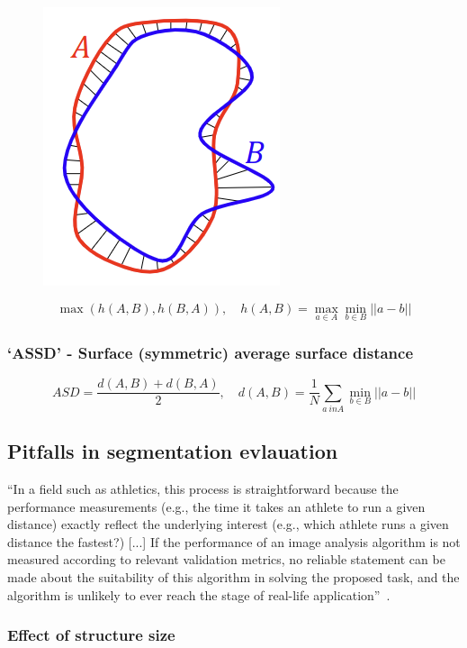 \documentclass[11pt]{article}
\begin{document}
\begin{figure}[H]
    \centering
    \includegraphics[width=.2\linewidth]{figures/Hausdorff.png}
\end{figure}

\begin{definition}
    \begin{equation*}
        \max(h(A,B),h(B,A)), \quad h(A,B) = \max_{a\in A} \min_{b\in B} ||a-b||
    \end{equation*}
\end{definition}

\subsubsection{`ASSD' - Surface (symmetric) average surface distance}

\begin{definition}
    \begin{equation*}
        ASD = \frac{d(A,B)+d(B,A)}{2}, \quad d(A,B)=\frac 1 N \sum_{a\ in A} \min_{b \in B} ||a - b||
    \end{equation*}
\end{definition}

\subsection{Pitfalls in segmentation evlauation}

``In a field such as athletics, this process is straightforward because the performance measurements (e.g., the time it takes an athlete to run a given distance) exactly reflect the underlying interest (e.g., which athlete runs a given distance the fastest?) [...] If the performance of an image analysis algorithm is not measured according to relevant validation metrics, no reliable statement can be made about the suitability of this algorithm in solving the proposed task, and the algorithm is unlikely to ever reach the stage of real-life application''~\cite{pitfalls-in-segmentation-evaluation}. 

\subsubsection{Effect of structure size}
\end{document}
